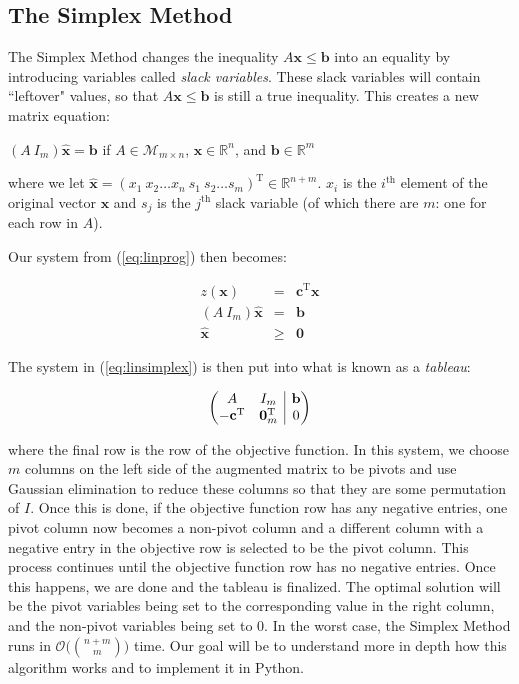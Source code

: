 \documentclass[11pt]{article}
\makeatletter
\newenvironment{amatrix}[1]{%
  \left(\begin{array}{@{}*{#1}{c}|c@{}}
}{%
  \end{array}\right)
}
\makeatother
\begin{document}
\subsection{The Simplex Method}

The Simplex Method changes the inequality $A \mathbf{x} \leq \mathbf{b}$ into an equality by introducing variables called \textit{slack variables}. These slack variables will contain ``leftover" values, so that $A\mathbf{x} \leq \mathbf{b}$ is still a true inequality. This creates a new matrix equation:

\begin{center}
    $(A\ I_m)\hat{\mathbf{x}} = \mathbf{b}$ if $A \in \mathcal{M}_{m \times n}$, $\mathbf{x} \in \mathbb{R}^n$, and $\mathbf{b} \in \mathbb{R}^m$
\end{center}

where we let $\hat{\mathbf{x}} = (x_1\ x_2 \ldots x_n\ s_1\ s_2 \ldots s_m)^\text{T} \in \mathbb{R}^{n+m}$. $x_i$ is the $i^\text{th}$ element of the original vector $\mathbf{x}$ and $s_j$ is the $j^\text{th}$ slack variable (of which there are $m$: one for each row in $A$).

Our system from (\ref{eq:linprog}) then becomes:

\begin{equation} \label{eq:linsimplex}
    \begin{array}{rcl}
        z(\mathbf{x}) & = & \mathbf{c}^\text{T} \mathbf{x} \\
        (A\ I_m) \hat{\mathbf{x}} & = & \mathbf{b} \\
        \hat{\mathbf{x}} & \geq & \mathbf{0}
    \end{array}
\end{equation}

The system in (\ref{eq:linsimplex}) is then put into what is known as a \textit{tableau}:

\begin{equation} \label{eq:tableau}
    \begin{amatrix}{2}
        A & I_m & \mathbf{b} \\
        -\mathbf{c}^\text{T} & \mathbf{0}_m^\text{T} & 0
    \end{amatrix}
\end{equation}

where the final row is the row of the objective function. In this system, we choose $m$ columns on the left side of the augmented matrix to be pivots and use Gaussian elimination to reduce these columns so that they are some permutation of $I$. Once this is done, if the objective function row has any negative entries, one pivot column now becomes a non-pivot column and a different column with a negative entry in the objective row is selected to be the pivot column. This process continues until the objective function row has no negative entries. Once this happens, we are done and the tableau is finalized. The optimal solution will be the pivot variables being set to the corresponding value in the right column, and the non-pivot variables being set to 0. In the worst case, the Simplex Method runs in $\mathcal{O}\big(\binom{n+m}{m}\big)$ time. Our goal will be to understand more in depth how this algorithm works and to implement it in Python.
\end{document}

